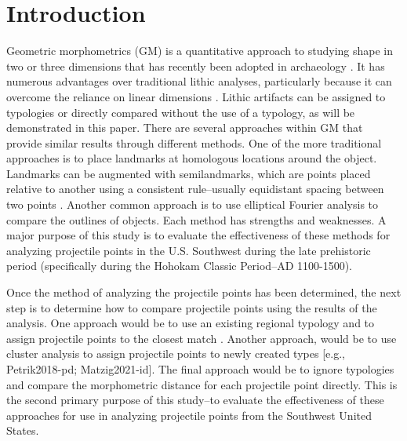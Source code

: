 \documentclass[a4paper]{article}
\begin{document}
\beginningpreprint  %
\linenumbers
\hypertarget{introduction}{%
\section*{Introduction}\label{introduction}}

Geometric morphometrics (GM) is a quantitative approach to studying shape in two or three dimensions that has recently been adopted in archaeology \autocites[see][]{MacLeod2017-yl,Okumura2019-ur}[ for overviews]{Shott2010-fn}. It has numerous advantages over traditional lithic analyses, particularly because it can overcome the reliance on linear dimensions \autocite[196-197]{Shott2010-fn}. Lithic artifacts can be assigned to typologies or directly compared without the use of a typology, as will be demonstrated in this paper. There are several approaches within GM that provide similar results through different methods. One of the more traditional approaches is to place landmarks at homologous locations around the object. Landmarks can be augmented with semilandmarks, which are points placed relative to another using a consistent rule--usually equidistant spacing between two points \autocite[2-4]{Okumura2019-ur}. Another common approach is to use elliptical Fourier analysis to compare the outlines of objects. Each method has strengths and weaknesses. A major purpose of this study is to evaluate the effectiveness of these methods for analyzing projectile points in the U.S. Southwest during the late prehistoric period (specifically during the Hohokam Classic Period--AD 1100-1500).

Once the method of analyzing the projectile points has been determined, the next step is to determine how to compare projectile points using the results of the analysis. One approach would be to use an existing regional typology and to assign projectile points to the closest match \autocite[e.g.,][]{Kocer2017-au}. Another approach, would be to use cluster analysis to assign projectile points to newly created types {[}e.g., Petrik2018-pd; Matzig2021-id{]}. The final approach would be to ignore typologies and compare the morphometric distance for each projectile point directly. This is the second primary purpose of this study--to evaluate the effectiveness of these approaches for use in analyzing projectile points from the Southwest United States.
\end{document}

